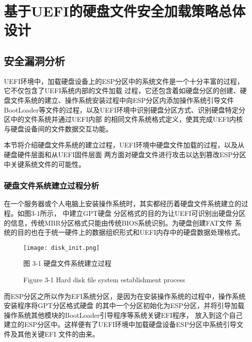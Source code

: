 %
%
\chapter{基于UEFI的硬盘文件安全加载策略总体设计}

%
%
\section{安全漏洞分析}
UEFI环境中，加载硬盘设备上的ESP分区中的系统文件是一个十分丰富的过程，它不仅包含了UEFI系统内部的文件加载
过程，它还包含着如硬盘分区的创建、硬盘文件系统的建立、操作系统安装过程中向ESP分区内添加操作系统引导文件
BootLoader等文件的过程，以及UEFI环境中识别硬盘分区方式、识别硬盘特定分区中的文件系统并通过UEFI内部
的相同文件系统格式定义，使其完成UEFI内核与硬盘设备间的文件数据交互功能\cite{chinese19}。
\par 本节将介绍硬盘文件系统的建立过程，UEFI环境中硬盘文件加载的过程，以及从硬盘硬件层面和从UEFI固件层面
两方面对硬盘文件进行攻击以达到篡改ESP分区中关键系统文件的可能性。
\subsection{硬盘文件系统建立过程分析}
在一个服务器或个人电脑上安装操作系统时，其实都经历着硬盘文件系统建立的过程\cite{chinese22}。如图3-1所示，
中建立GPT硬盘
分区格式的目的为让UEFI可识别出硬盘分区的信息，传统MBR分区格式只能由传统BIOS系统识别。为硬盘创建FAT文件
系统的目的也在于统一硬件上的数据组织形式和UEFI内存中的硬盘数据处理格式\cite{extra1}。

\begin{figure}[htb]
    \vspace{0cm}   
    \setlength{\abovecaptionskip}{0.3cm}  
	\centering
    \texttt{[image: disk\_init.png]}
    \caption*{图 3-1 硬盘文件系统建立过程}
    \setlength{\belowcaptionskip}{-0.7cm}
    \caption*{Figure 3-1 Hard disk file system establishment process}
\end{figure}

而ESP分区之所以作为EFI系统分区，是因为在安装操作系统的过程中，操作系统安装程序将GPT分区格式硬盘
的其中一个分区初始化为ESP分区，并将引导加载操作系统其他模块的BootLoader引导程序等系统关键EFI程序，
放入到这个自己建立的ESP分区中。这样便有了UEFI环境中加载硬盘设备ESP分区中系统引导文件及其他关键EFI
文件的由来。

